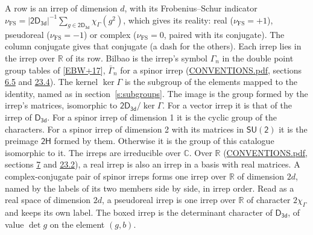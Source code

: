 \documentclass[10pt,a4paper]{article}
\numberwithin{equation}{section}
\newcommand{\grp}[1]{\mathsf{#1}}
\newcommand{\irchar}[1]{\chi_{#1}}
\newcommand{\fsind}{\nu_{\mathrm{FS}}}
\begin{document}
\leavevmode\label{n:index.frobenius}\label{n:head.irrep}\label{n:head.reality}A row is an irrep of dimension $d$, with its Frobenius--Schur indicator $\fsind = |\grp{2D_{3d}}|^{-1}\allowbreak\sum_{g\in\grp{2D_{3d}}}\irchar{\Gamma}(g^2)$, which gives its reality: real ($\fsind = +1$), pseudoreal ($\fsind = -1$) or complex ($\fsind = 0$, paired with its conjugate). \label{n:head.conjugate}The column conjugate gives that conjugate (a dash for the others). \label{n:head.over.real}Each irrep lies in the irrep over $\mathbb{R}$ of its row. \label{n:head.bilbao}\label{n:irrep.alias.gamma}Bilbao is the irrep's symbol $\Gamma_n$ in the double point group tables of [\href{../../../REFERENCES.pdf\#ref.EBW+17}{EBW+17}], $\bar{\Gamma}_n$ for a spinor irrep (\href{../../CONVENTIONS.pdf}{CONVENTIONS.pdf}, sections \href{../../../rotation/CONVENTIONS.pdf\#conv.6.5}{6.5} and \href{../../CONVENTIONS.pdf\#conv.23.4}{23.4}). \label{n:head.kernel}The kernel $\ker\Gamma$ is the subgroup of the elements mapped to the identity, named as in section~\ref{s:subgroups}. \label{n:head.image}The image is the group formed by the irrep's matrices, isomorphic to $\grp{2D_{3d}}/\ker\Gamma$. For a vector irrep it is that of the irrep of \href{../../../rotation/data/pdf/D3d.pdf}{$\grp{D_{3d}}$}. For a spinor irrep of dimension 1 it is the cyclic group of the characters. For a spinor irrep of dimension 2 with its matrices in $\grp{SU(2)}$ it is the preimage $\grp{2H}$ formed by them. Otherwise it is the group of this catalogue isomorphic to it. The irreps are irreducible over $\mathbb{C}$. Over $\mathbb{R}$ (\href{../../CONVENTIONS.pdf}{CONVENTIONS.pdf}, sections \href{../../../rotation/CONVENTIONS.pdf\#conv.7}{7} and \href{../../CONVENTIONS.pdf\#conv.23.2}{23.2}), a real irrep is also an irrep in a basis with real matrices. A complex-conjugate pair of spinor irreps forms one irrep over $\mathbb{R}$ of dimension $2d$, named by the labels of its two members side by side, in irrep order. Read as a real space of dimension $2d$, a pseudoreal irrep is one irrep over $\mathbb{R}$ of character $2\irchar{\Gamma}$ and keeps its own label. \label{n:mark.determinant}The boxed irrep is the determinant character of \href{../../../rotation/data/pdf/D3d.pdf}{$\grp{D_{3d}}$}, of value $\det g$ on the element $(g, b)$.
\setlength{\emergencystretch}{2em}\par\setlength{\emergencystretch}{0pt}
\end{document}
